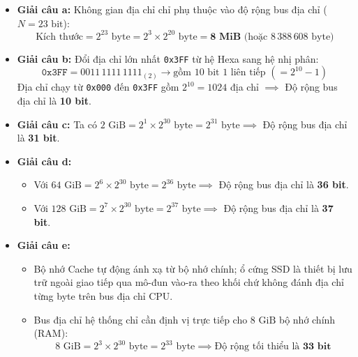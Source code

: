 \begin{itemize}
    \item \textbf{Giải câu a:} Không gian địa chỉ chỉ phụ thuộc vào độ rộng bus địa chỉ ($N = 23\text{ bit}$):
    $$\text{Kích thước} = 2^{23}\text{ byte} = 2^3 \times 2^{20}\text{ byte} = \mathbf{8\text{ MiB}}\text{ (hoặc } 8\,388\,608\text{ byte)}$$
    \item \textbf{Giải câu b:} Đổi địa chỉ lớn nhất \texttt{0x3FF} từ hệ Hexa sang hệ nhị phân:
    $$\texttt{0x3FF} = 0011\,1111\,1111_{(2)} \rightarrow \text{gồm } 10\text{ bit } 1\text{ liên tiếp } (= 2^{10} - 1)$$
    Địa chỉ chạy từ \texttt{0x000} đến \texttt{0x3FF} gồm $2^{10} = 1024$ địa chỉ $\implies$ Độ rộng bus địa chỉ là \textbf{10 bit}.
    \item \textbf{Giải câu c:} Ta có $2\text{ GiB} = 2^1 \times 2^{30}\text{ byte} = 2^{31}\text{ byte} \implies$ Độ rộng bus địa chỉ là \textbf{31 bit}.
    \item \textbf{Giải câu d:}
    \begin{itemize}
        \item Với $64\text{ GiB} = 2^6 \times 2^{30}\text{ byte} = 2^{36}\text{ byte} \implies$ Độ rộng bus địa chỉ là \textbf{36 bit}.
        \item Với $128\text{ GiB} = 2^7 \times 2^{30}\text{ byte} = 2^{37}\text{ byte} \implies$ Độ rộng bus địa chỉ là \textbf{37 bit}.
    \end{itemize}
    \item \textbf{Giải câu e:}
    \begin{itemize}
        \item Bộ nhớ Cache tự động ánh xạ từ bộ nhớ chính; ổ cứng SSD là thiết bị lưu trữ ngoài giao tiếp qua mô-đun vào-ra theo khối chứ không đánh địa chỉ từng byte trên bus địa chỉ CPU.
        \item Bus địa chỉ hệ thống chỉ cần định vị trực tiếp cho $8\text{ GiB}$ bộ nhớ chính (RAM):
        $$8\text{ GiB} = 2^3 \times 2^{30}\text{ byte} = 2^{33}\text{ byte} \implies \text{Độ rộng tối thiểu là }\mathbf{33\text{ bit}}$$
    \end{itemize}
\end{itemize}

